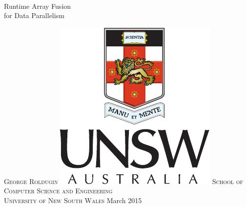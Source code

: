 \documentclass[preamble.tex]{subfiles}
\begin{document}
\newenvironment{bookmanfont}{\fontfamily{pbk}\selectfont}{\par}
\newenvironment{palatinofont}{\fontfamily{pbk}\selectfont}{\par}

\begin{titlepage}
    \centering
    ~\\
    \vskip1cm
    \begin{bookmanfont}
    \Huge{Runtime Array Fusion\\for Data Parallelism} 
    \end{bookmanfont}
    \vskip2cm
    \Large\textsc{George Roldugin}
    \vfill
    \vfill
    \includegraphics[scale=1.2]{img/UNSW-Portrait-Colour}
    \vfill
    \Large\textsc{
        School of Computer Science and Engineering\\
        University of New South Wales
    }
    \vfill
    March 2015
    \vfill
\end{titlepage}

\end{document}
